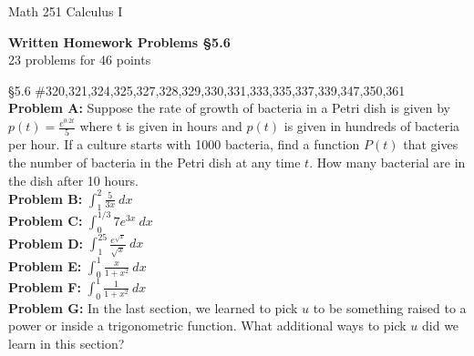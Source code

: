 \documentclass[11pt]{report}
\theoremstyle{plain}
\begin{document}
\hfill Math 251 Calculus I
\begin{center}
\Large{\textbf{Written Homework Problems \S 5.6}} \\
23 problems for 46 points\\
\end{center}

{\S 5.6} \#320,321,324,325,327,328,329,330,331,333,335,337,339,347,350,361\\


\textbf{Problem A:} Suppose the rate of growth of bacteria in a Petri dish is given by $p(t) = \frac{e^{0.2t}}{5}$
where t is given in hours and $p(t)$ is given in hundreds of bacteria per hour. If a culture starts with 1000 bacteria, find a function $P(t)$ that gives the number of bacteria in the Petri dish at any time $t.$ How many bacterial are in the dish after 10 hours.\\

\textbf{Problem B:} $\displaystyle \int_ 1^2 \frac{5}{3x} \:dx$\\

\textbf{Problem C:} $\displaystyle \int_0^{1/3} 7e^{3x} \: dx $\\

\textbf{Problem D:} $\displaystyle \int_1^{25} \frac{e^{\sqrt{x}}}{\sqrt{x}} \: dx $\\

\textbf{Problem E:} $\displaystyle \int_0^1 \frac{x}{1+x^2} \: dx $\\

\textbf{Problem F:} $\displaystyle\int_0^1 \frac{1}{1+x^2} \: dx $\\

\textbf{Problem G:} In the last section, we learned to pick $u$ to be something raised to a power or inside a trigonometric function. What additional ways to pick $u$ did we learn in this section?
\end{document}
